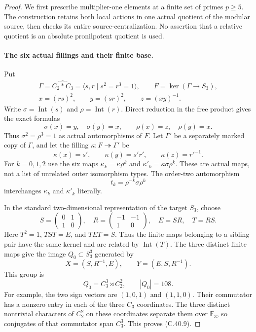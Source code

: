 \begin{proof}
We first prescribe multiplier-one elements at a finite set of
primes $p\geq5$. The construction retains both local actions
in one actual quotient of the modular source, then checks its
entire source-centralization. No assertion that a relative
quotient is an absolute pronilpotent quotient is used.

\paragraph{The six actual fillings and their finite base.}
Put
\[
 \begin{gathered}
 \Gamma=\widehat{C_2*C_3}=\langle s,r\mid s^2=r^3=1\rangle,
 \qquad F=\ker(\Gamma\to S_3),\\
 x=(rs)^2,\qquad y=(sr)^2,\qquad z=(xy)^{-1}.
 \end{gathered}
                                                        \tag{C.40.3}
\]
Write $\sigma=\operatorname{Int}(s)$ and
$\rho=\operatorname{Int}(r)$. Direct reduction in the free
product gives the exact formulas
\[
 \sigma(x)=y,\quad\sigma(y)=x,\qquad
 \rho(x)=z,\quad\rho(y)=x.                              \tag{C.40.4}
\]
Thus $\sigma^2=\rho^3=1$ as actual automorphisms of $F$.
Let $\Gamma'$ be a separately marked copy of $\Gamma$, and
let the filling $\kappa:F\twoheadrightarrow\Gamma'$ be
\[
       \kappa(x)=s',\qquad \kappa(y)=s'r',\qquad
                         \kappa(z)=r'^{-1}.
                                                        \tag{C.40.5}
\]
For $k=0,1,2$ use the six maps
$\kappa_k=\kappa\rho^k$ and
$\kappa'_k=\kappa\sigma\rho^k$. These are actual maps,
not a list of unrelated outer isomorphism types. The order-two
automorphism
\[
                     t_k=\rho^{-k}\sigma\rho^k
                                                        \tag{C.40.6}
\]
interchanges $\kappa_k$ and $\kappa'_k$ literally.

In the standard two-dimensional representation of the target
$S_3$, choose
\[
 S=\begin{pmatrix}0&1\\1&0\end{pmatrix},\quad
 R=\begin{pmatrix}-1&-1\\1&0\end{pmatrix},\quad
 E=SR,\quad T=RS.
                                                        \tag{C.40.7}
\]
Here $T^2=1$, $TST=E$, and $TET=S$. Thus the finite
maps belonging to a sibling pair have the same kernel and
are related by $\operatorname{Int}(T)$. The three distinct
finite maps give the image $Q_0\subset S_3^3$ generated by
\[
             X=(S,R^{-1},E),\qquad Y=(E,S,R^{-1}).
                                                        \tag{C.40.8}
\]
This group is
\[
                  Q_0=C_3^3\rtimes C_2^2,
                       \qquad |Q_0|=108.              \tag{C.40.9}
\]
For example, the two sign vectors are $(1,0,1)$ and
$(1,1,0)$. Their commutator has a nonzero entry in each
of the three $C_3$ coordinates. The three distinct
nontrivial characters of $C_2^2$ on these coordinates
separate them over $\mathbb F_3$, so conjugates of that
commutator span $C_3^3$. This proves (C.40.9).


\end{proof}
